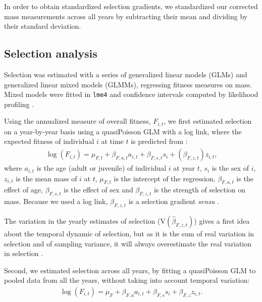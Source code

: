 In order to obtain standardized selection gradients, we standardized our corrected mass measurements across all years by subtracting their mean and dividing by their standard deviation.

\subsection*{Selection analysis}

Selection was estimated with a series of generalized linear models (GLMs) and  generalized linear mixed models (GLMMs), regressing fitness measures on mass. Mixed models were fitted in \texttt{lme4} and confidence intervals computed by likelihood profiling \parencite{Bates2014a}. 

Using the annualized measure of overall fitness, $F_{i,t}$, we first estimated selection on a year-by-year basis using a quasiPoisson GLM with a log link, where the expected fitness of individual $i$ at time $t$ is predicted from : 
\begin{align}
\log(F_{i,t}) = \mu_{F,t} + \beta_{F,a,t} a_{i,t} + \beta_{F,s,t} s_{i} + (\beta_{F,z,t})z_{i,t} \text{,}
\label{eq:mod1}
\end{align}
where $a_{i,t}$ is the age (adult or juvenile) of individual $i$ at year $t$, $s_{i}$ is the sex of $i$, $z_{i,t}$ is the mean mass of $i$ at $t$, $\mu_{F,t}$ is the intercept of the regression, $\beta_{F,a,t}$ is the effect of age, $\beta_{F,s,t}$ is the effect of sex and $\beta_{F,z,t}$ is the strength of selection on mass. Because we used a log link, $\beta_{F,z,t}$ is a selection gradient \textit{sensu} \cite{Lande1983} \parencite{Smouse1999,Firth2015}.

The variation in the yearly estimates of selection ($\mathrm{V}(\hat{\beta}_{F,z,t})$) gives a first idea about the temporal dynamic of selection, but as it is the sum of real variation in selection and of sampling variance, it will always overestimate the real variation in selection \parencite{Morrissey2012flusel}.

Second, we estimated selection across all years, by fitting a quasiPoisson GLM to pooled data from all the years, without taking into account temporal variation:
\begin{align}
\log(F_{i,t}) = \mu_{F} + \beta_{F,a} a_{i,t} + \beta_{F,s} s_{i} + \beta_{F,z} z_{i,t} \text{.}
\label{eq:modallyears}
\end{align}

